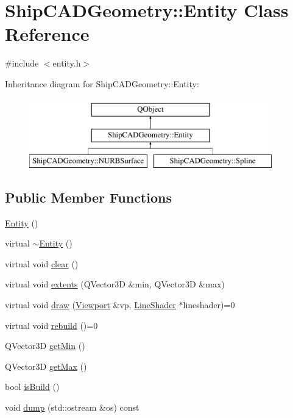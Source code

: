 \hypertarget{classShipCADGeometry_1_1Entity}{\section{Ship\-C\-A\-D\-Geometry\-:\-:Entity Class Reference}
\label{classShipCADGeometry_1_1Entity}
}


{\ttfamily \#include $<$entity.\-h$>$}

Inheritance diagram for Ship\-C\-A\-D\-Geometry\-:\-:Entity\-:\begin{figure}[H]
\begin{center}
\leavevmode
\includegraphics[height=3.000000cm]{classShipCADGeometry_1_1Entity}
\end{center}
\end{figure}
\subsection*{Public Member Functions}
\begin{DoxyCompactItemize}
\item 
\hyperlink{classShipCADGeometry_1_1Entity_a980f368aa07ce358583982821533a54a}{Entity} ()
\item 
virtual \hyperlink{classShipCADGeometry_1_1Entity_a37d42f94118b633fd336c2896f4aae8a}{$\sim$\-Entity} ()
\item 
virtual void \hyperlink{classShipCADGeometry_1_1Entity_a998d0e5d360371046fd5835ba1e0877a}{clear} ()
\item 
virtual void \hyperlink{classShipCADGeometry_1_1Entity_a08e8e53770c85002afa45f46e7bf10f8}{extents} (Q\-Vector3\-D \&min, Q\-Vector3\-D \&max)
\item 
virtual void \hyperlink{classShipCADGeometry_1_1Entity_a894bb00b5f65692c1a64e62d748f4041}{draw} (\hyperlink{classShipCADGeometry_1_1Viewport}{Viewport} \&vp, \hyperlink{classShipCADGeometry_1_1LineShader}{Line\-Shader} $\ast$lineshader)=0
\item 
virtual void \hyperlink{classShipCADGeometry_1_1Entity_ad49217d575c57a1fcc99768081b864ee}{rebuild} ()=0
\item 
Q\-Vector3\-D \hyperlink{classShipCADGeometry_1_1Entity_a759d6dedd36bf6562fbf36e816d9a5af}{get\-Min} ()
\item 
Q\-Vector3\-D \hyperlink{classShipCADGeometry_1_1Entity_a3af98adafb45eb573675a8ccc44fe14e}{get\-Max} ()
\item 
bool \hyperlink{classShipCADGeometry_1_1Entity_a131cd27d923ba1d2658528b679b9a90c}{is\-Build} ()
\item 
void \hyperlink{classShipCADGeometry_1_1Entity_a395d7573df06482d9deaecdc87d46944}{dump} (std\-::ostream \&os) const 
\end{DoxyCompactItemize}
